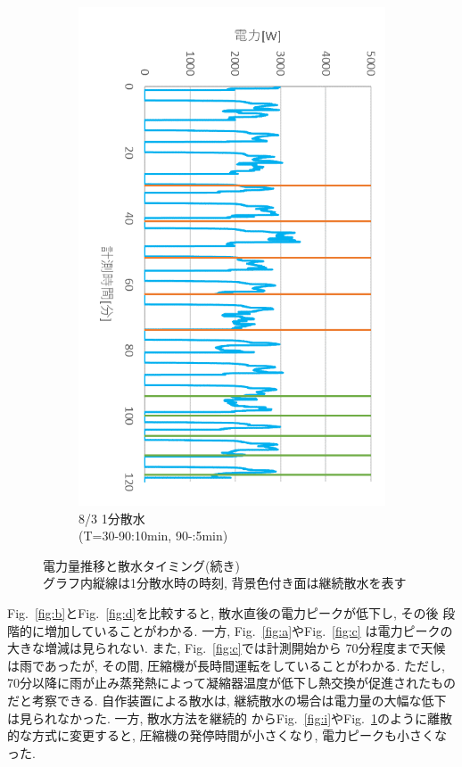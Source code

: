 \documentclass[a4j,fleqn,dvipdfmx,uplatex]{jsarticle}
\newcommand{\figref}[1]{Fig.\ \ref{#1}}
\begin{document}
\begin{figure}[htb]
\begin{subfigure}[t]{0.32\linewidth}
    \includegraphics[width=\linewidth]{img/t_p/20220803.png}
    \caption{8/3 1分散水\\ \small (T=30-90:10min, 90-:5min)}\label{fig:j}
  \end{subfigure}
  \caption{電力量推移と散水タイミング(続き)\\ \small グラフ内縦線は1分散水時の時刻, 背景色付き面は継続散水を表す}\label{fig:ex_outputs_2/2}
\end{figure}

\figref{fig:b}と\figref{fig:d}を比較すると, 散水直後の電力ピークが低下し, その後
段階的に増加していることがわかる. 一方, \figref{fig:a}や\figref{fig:c}
は電力ピークの大きな増減は見られない. また, \figref{fig:c}では計測開始から
70分程度まで天候は雨であったが, その間, 圧縮機が長時間運転をしていることがわかる. 
ただし, 70分以降に雨が止み蒸発熱によって凝縮器温度が低下し熱交換が促進されたものだと考察できる. 
自作装置による散水は, 継続散水の場合は電力量の大幅な低下は見られなかった. 一方, 散水方法を継続的
から\figref{fig:i}や\figref{fig:j}のように離散的な方式に変更すると, 圧縮機の発停時間が小さくなり, 
電力ピークも小さくなった. 
\end{document}
